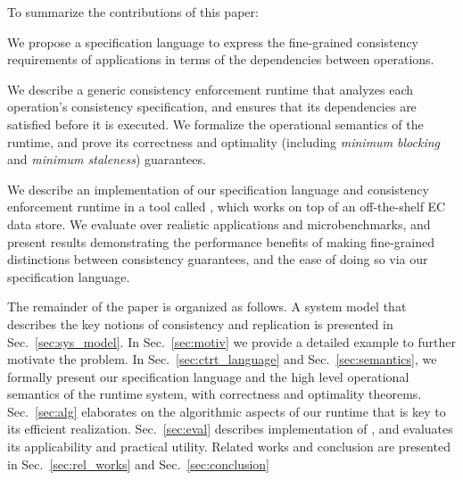 To summarize the contributions of this paper:
\begin{enumerate*}[label=(\roman*)]  
\item We propose a specification language to
    express the fine-grained consistency requirements of applications 
    in terms of the dependencies between operations.

\item We describe a generic consistency enforcement runtime that
    analyzes each operation's consistency specification, and ensures
    that its dependencies are satisfied before it is executed.    
    We formalize the operational semantics of the runtime, and prove its
    correctness and optimality (including \emph{minimum blocking} and
    \emph {minimum staleness}) guarantees. 
    
  \item We describe an implementation of our specification language and
    consistency enforcement runtime in a tool called \tool, which
    works on top of an off-the-shelf EC data store. We evaluate \tool
    over realistic applications and microbenchmarks, and present
    results demonstrating the performance benefits of making
    fine-grained distinctions between consistency guarantees, and the
    ease of doing so via our specification language.

\end{enumerate*}

The remainder of the paper is organized as follows. A system model that
describes the key notions of consistency and
replication is presented in Sec.~\ref{sec:sys_model}.  In
Sec.~\ref{sec:motiv} we provide a detailed example to further motivate
the problem.  In Sec.~\ref{sec:ctrt_language} and
Sec.~\ref{sec:semantics}, we formally present our specification language
and the high level operational semantics of the runtime system, with
correctness and optimality theorems. Sec.~\ref{sec:alg}
elaborates on the algorithmic aspects of our runtime that is key to
its efficient realization. Sec.~\ref{sec:eval} describes
implementation of \tool, and evaluates its applicability and practical utility.
Related works and conclusion are presented in
Sec.~\ref{sec:rel_works} and Sec.~\ref{sec:conclusion}








